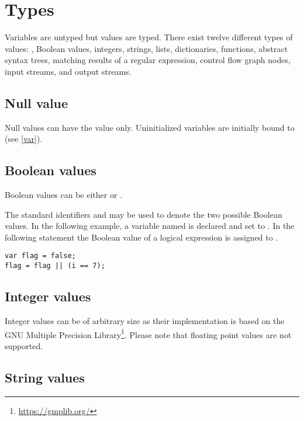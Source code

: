 \chapter{Types}

Variables are untyped but values are typed. There exist twelve different
types of values: , Boolean values, integers, strings,
lists, dictionaries, functions, abstract syntax trees, matching
results of a regular expression, control flow graph nodes, input
streams, and output streams.

\section{Null value}\label{null}

Null values can have the value  only.
Uninitialized variables are initially bound to 
(see \ref{var}).

\section{Boolean values}

Boolean values can be either  or .

The standard identifiers  and 
may be used to denote the two possible Boolean values. In
the following example, a variable named  is
declared and set to . In the following statement
the Boolean value of a logical expression is assigned to .

\begin{lstlisting}
var flag = false;
flag = flag || (i == 7);
\end{lstlisting}

\section{Integer values}\label{integer}

Integer values can be of arbitrary size as their
implementation is based on the GNU Multiple Precision
Library\footnote{\url{https://gmplib.org/}}. Please note that floating point values
are not supported.

\section{String values}\label{string}

